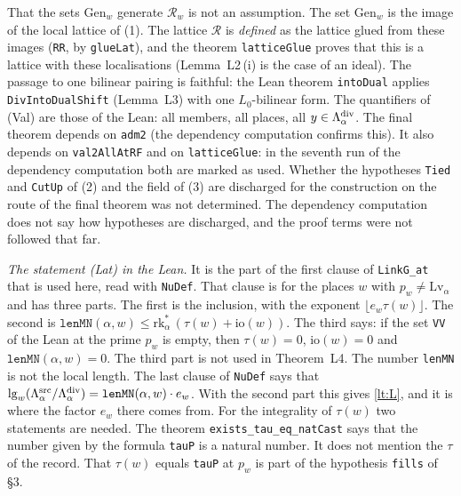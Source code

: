 \documentclass[11pt,letterpaper]{article}
\begin{document}
That the sets $\mathrm{Gen}_w$ generate $\mathcal R_w$ is not an assumption. The set $\mathrm{Gen}_w$ is the
image of the local lattice of \textup{(1)}. The lattice $\mathcal R$ is \emph{defined} as the lattice
glued from these images (\texttt{RR}, by \texttt{glueLat}), and the theorem \texttt{latticeGlue} proves
that this is a lattice with these localisations (Lemma~L2\,(i) is the case of an ideal). The passage to one
bilinear pairing is faithful: the Lean theorem \texttt{intoDual} applies \texttt{DivIntoDualShift}
(Lemma~L3) with one $L_0$-bilinear form. The quantifiers of \textup{(Val)} are those of the Lean: all
members, all places, all $y\in\Lambda^{\rm div}_\alpha$. The final theorem depends on \texttt{adm2} (the
dependency computation confirms this). It also depends on \texttt{val2AllAtRF} and on
\texttt{latticeGlue}: in the seventh run of the dependency computation both are marked as used. Whether the
hypotheses \texttt{Tied} and \texttt{CutUp} of \textup{(2)} and the field of \textup{(3)} are discharged
for the construction on the route of the final theorem was not determined. The dependency computation does
not say how hypotheses are discharged, and the proof terms were not followed that far.

\emph{The statement \textup{(Lat)} in the Lean.} It is the part of the first clause of \texttt{LinkG\_at}
that is used here, read with \texttt{NuDef}. That clause is for the places $w$ with
$p_w\ne\mathrm{Lv}_\alpha$ and has three parts. The first is the inclusion, with the exponent
$\lfloor e_w\tau(w)\rfloor$. The second is
$\mathtt{lenMN}(\alpha,w)\le\mathrm{rk}^*_\alpha\,(\tau(w)+\mathrm{io}(w))$. The third says: if the set
\texttt{VV} of the Lean at the prime $p_w$ is empty, then $\tau(w)=0$, $\mathrm{io}(w)=0$ and
$\mathtt{lenMN}(\alpha,w)=0$. The third part is not used in Theorem~L4. The number \texttt{lenMN} is not
the local length. The last clause of \texttt{NuDef} says that
$\lg_w(\Lambda^{\rm src}_\alpha/\Lambda^{\rm div}_\alpha)=\mathtt{lenMN}(\alpha,w)\cdot e_w$. With the
second part this gives \eqref{lt:L}, and it is where the factor $e_w$ there comes from. For the
integrality of $\tau(w)$ two statements are needed. The theorem \texttt{exists\_tau\_eq\_natCast} says that
the number given by the formula \texttt{tauP} is a natural number. It does not mention the $\tau$ of the
record. That $\tau(w)$ equals \texttt{tauP} at $p_w$ is part of the hypothesis \texttt{fills} of \S3.
\end{document}
